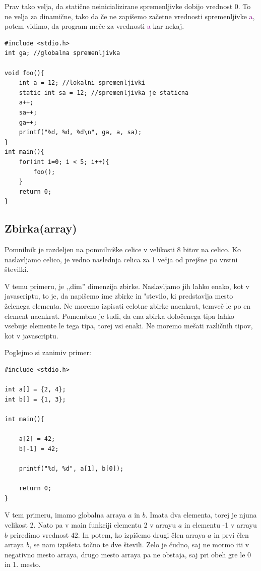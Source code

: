 \documentclass[a4paper, 12pt]{article}
\begin{document}
Prav tako velja, da statične neinicializirane spremenljivke dobijo vrednost 0. To ne velja za dinamične, tako da če ne zapišemo začetne vrednosti spremenljivke \textcolor{purple}{a}, potem vidimo, da program meče za vrednosti \textcolor{purple}{a} kar nekaj.

\pagebreak

\begin{lstlisting}
#include <stdio.h>
int ga; //globalna spremenljivka

void foo(){
	int a = 12;	//lokalni spremenljivki
	static int sa = 12; //spremenljivka je staticna
	a++;
	sa++;
	ga++;
	printf("%d, %d, %d\n", ga, a, sa);
}
int main(){
	for(int i=0; i < 5; i++){
		foo();
	}
	return 0;
}	
\end{lstlisting}
\subsection{Zbirka(array)}
Pomnilnik je razdeljen na pomnilniške celice v velikosti 8 bitov na celico. Ko naslavljamo celico, je vedno naslednja celica za 1 večja od prejšne po vrstni številki. \

\begin{center}
\end{center}

V temu primeru, je ,,dim'' dimenzija zbirke. Naslavljamo jih lahko enako, kot v javascriptu, to je, da napišemo ime zbirke in "stevilo, ki predstavlja mesto želenega elementa. Ne moremo izpisati celotne zbirke naenkrat, temveč le po en element naenkrat. Pomembno je tudi, da ena zbirka določenega tipa lahko vsebuje elemente le tega tipa, torej vsi enaki. Ne moremo mešati različnih tipov, kot v javascriptu.

Poglejmo si zanimiv primer:

\begin{lstlisting}
#include <stdio.h>

int a[] = {2, 4};
int b[] = {1, 3};

int main(){

	a[2] = 42;
	b[-1] = 42;

	printf("%d, %d", a[1], b[0]);

	return 0;
}
\end{lstlisting}

V tem primeru, imamo globalna arraya $a$ in $b$. Imata dva elementa, torej je njuna velikost 2. Nato pa v main funkciji elementu 2 v arrayu $a$ in elementu -1 v arrayu $b$ priredimo vrednost 42. In potem, ko izpišemo drugi člen arraya $a$ in prvi člen arraya $b$, se nam izpišeta točno te dve števili. Zelo je čudno, saj ne mormo iti v negativno mesto arraya, drugo mesto arraya pa ne obstaja, saj pri obeh gre le 0 in 1. mesto.
\end{document}
